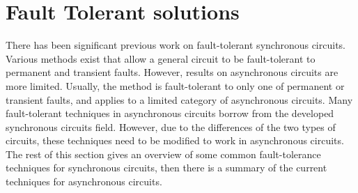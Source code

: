 \documentclass[12pt]{report}
\begin{document}

\section{Fault Tolerant solutions}

There has been significant previous work on fault-tolerant synchronous circuits.  Various methods exist that allow a general circuit to be fault-tolerant to permanent and transient faults.  However, results on asynchronous circuits are more limited.  Usually, the method is fault-tolerant to only one of permanent or transient faults, and applies to a limited category of asynchronous circuits.  Many fault-tolerant techniques in asynchronous circuits borrow from the developed synchronous circuits field.  However, due to the differences of the two types of circuits, these techniques need to be modified to work in asynchronous circuits.  The rest of this section gives an overview of some common fault-tolerance techniques for synchronous circuits, then there is a summary of the current techniques for asynchronous circuits. \\


\end{document}
